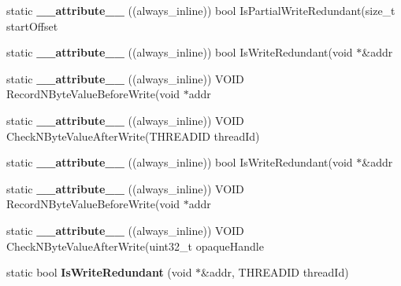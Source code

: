 \begin{DoxyCompactItemize}
\item 
\hypertarget{structRedSpyAnalysis_acb8312eee9deb99291c4052fdbd66887}{static {\bfseries \-\_\-\-\_\-attribute\-\_\-\-\_\-} ((always\-\_\-inline)) bool Is\-Partial\-Write\-Redundant(size\-\_\-t start\-Offset}\label{structRedSpyAnalysis_acb8312eee9deb99291c4052fdbd66887}

\item 
\hypertarget{structRedSpyAnalysis_a7535fac0a0e053e60b39fa2f23b3701f}{static {\bfseries \-\_\-\-\_\-attribute\-\_\-\-\_\-} ((always\-\_\-inline)) bool Is\-Write\-Redundant(void $\ast$\&addr}\label{structRedSpyAnalysis_a7535fac0a0e053e60b39fa2f23b3701f}

\item 
\hypertarget{structRedSpyAnalysis_ad09b31fd6c23d44ab50798a11711fb1a}{static {\bfseries \-\_\-\-\_\-attribute\-\_\-\-\_\-} ((always\-\_\-inline)) V\-O\-I\-D Record\-N\-Byte\-Value\-Before\-Write(void $\ast$addr}\label{structRedSpyAnalysis_ad09b31fd6c23d44ab50798a11711fb1a}

\item 
\hypertarget{structRedSpyAnalysis_acd89ba949f9f73d9bba3bf8c0c057f90}{static {\bfseries \-\_\-\-\_\-attribute\-\_\-\-\_\-} ((always\-\_\-inline)) V\-O\-I\-D Check\-N\-Byte\-Value\-After\-Write(T\-H\-R\-E\-A\-D\-I\-D thread\-Id)}\label{structRedSpyAnalysis_acd89ba949f9f73d9bba3bf8c0c057f90}

\item 
\hypertarget{structRedSpyAnalysis_a7535fac0a0e053e60b39fa2f23b3701f}{static {\bfseries \-\_\-\-\_\-attribute\-\_\-\-\_\-} ((always\-\_\-inline)) bool Is\-Write\-Redundant(void $\ast$\&addr}\label{structRedSpyAnalysis_a7535fac0a0e053e60b39fa2f23b3701f}

\item 
\hypertarget{structRedSpyAnalysis_ad09b31fd6c23d44ab50798a11711fb1a}{static {\bfseries \-\_\-\-\_\-attribute\-\_\-\-\_\-} ((always\-\_\-inline)) V\-O\-I\-D Record\-N\-Byte\-Value\-Before\-Write(void $\ast$addr}\label{structRedSpyAnalysis_ad09b31fd6c23d44ab50798a11711fb1a}

\item 
\hypertarget{structRedSpyAnalysis_ab62f13b23858cc46ae34b668b71afe80}{static {\bfseries \-\_\-\-\_\-attribute\-\_\-\-\_\-} ((always\-\_\-inline)) V\-O\-I\-D Check\-N\-Byte\-Value\-After\-Write(uint32\-\_\-t opaque\-Handle}\label{structRedSpyAnalysis_ab62f13b23858cc46ae34b668b71afe80}

\item 
\hypertarget{structRedSpyAnalysis_a0a5d87c8a4ffd7e99a66272071b48b2a}{static bool {\bfseries Is\-Write\-Redundant} (void $\ast$\&addr, T\-H\-R\-E\-A\-D\-I\-D thread\-Id)}\label{structRedSpyAnalysis_a0a5d87c8a4ffd7e99a66272071b48b2a}


\end{DoxyCompactItemize}
